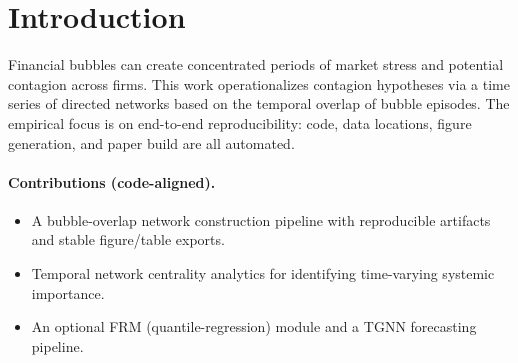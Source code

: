 \section{Introduction}

Financial bubbles can create concentrated periods of market stress and potential contagion across firms.
This work operationalizes contagion hypotheses via a time series of directed networks based on the temporal overlap of bubble episodes.
The empirical focus is on end-to-end reproducibility: code, data locations, figure generation, and paper build are all automated.

\paragraph{Contributions (code-aligned).}
\begin{itemize}
  \item A bubble-overlap network construction pipeline with reproducible artifacts and stable figure/table exports.
  \item Temporal network centrality analytics for identifying time-varying systemic importance.
  \item An optional FRM (quantile-regression) module and a TGNN forecasting pipeline.
\end{itemize}

